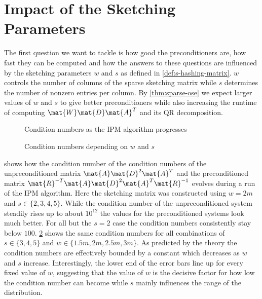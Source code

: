 \section{Impact of the Sketching Parameters}

The first question we want to tackle is how good the preconditioners are, how fast they can be computed and how the answers to these questions are influenced by the sketching parameters \(w\) and \(s\) as defined in \cref{def:s-hashing-matrix}. \(w\) controls the number of columns of the sparse sketching matrix while \(s\) determines the number of nonzero entries per column.
By \cref{thm:sparse-ose} we expect larger values of \(w\) and \(s\) to give better preconditioners while also increasing the runtime of computing \(\mat{W}\mat{D}\mat{A}^T\) and its QR decomposition.

\begin{figure}[tbp]
  \centering%
  \caption{Condition numbers as the IPM algorithm progresses}%
  \label{fig:condition_number_history}
\end{figure}

\begin{figure}[tbp]%
  \centering%
  \caption{Condition numbers depending on \(w\) and \(s\)}%
  \label{fig:condition_number}
\end{figure}%

 shows how the condition number of the condition numbers of the unpreconditioned matrix \(\mat{A}\mat{D}^2\mat{A}^T\) and the preconditioned matrix \(\mat{R}^{-T}\mat{A}\mat{D}^2\mat{A}^T\mat{R}^{-1}\) evolves during a run of the IPM algorithm.
Here the sketching matrix was constructed using \(w=2m\) and \(s \in \{2, 3, 4, 5\}\).
While the condition number of the unpreconditioned system steadily rises up to about \(10^{12}\) the values for the preconditioned systems look much better.
For all but the \(s=2\) case the condition numbers consistently stay below \(100\).
\cref{fig:condition_number} shows the same condition numbers for all combinations of \(s \in \{3,4,5\}\) and \(w \in \{1.5m, 2m, 2.5m, 3m\}\).
As predicted by the theory the condition numbers are effectively bounded by a constant which decreases as \(w\) and \(s\) increase.
Interestingly, the lower end of the error bars line up for every fixed value of \(w\), suggesting that the value of \(w\) is the decisive factor for how low the condition number can become while \(s\) mainly influences the range of the distribution.

